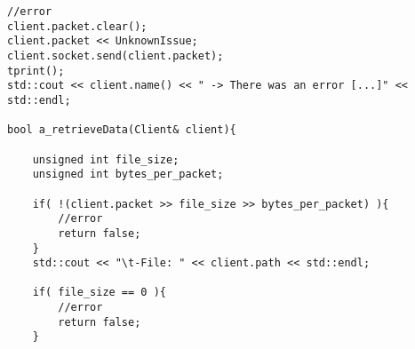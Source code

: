 \begin{lstlisting}
//error
client.packet.clear();
client.packet << UnknownIssue;
client.socket.send(client.packet);
tprint();
std::cout << client.name() << " -> There was an error [...]" << std::endl;

bool a_retrieveData(Client& client){

    unsigned int file_size;
    unsigned int bytes_per_packet;

    if( !(client.packet >> file_size >> bytes_per_packet) ){
        //error
        return false;
    }
    std::cout << "\t-File: " << client.path << std::endl;

    if( file_size == 0 ){
        //error
        return false;
    }
\end{lstlisting}